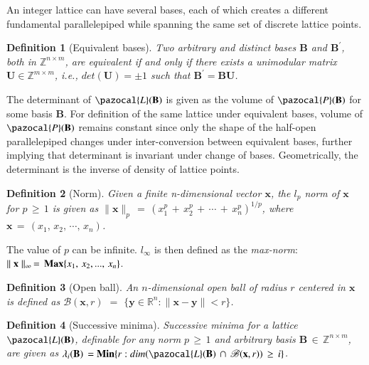 \documentclass[10pt]{elsarticle}
\newtheorem{definition}{Definition}
\begin{document}
An integer lattice can have several bases, each of which creates a different fundamental parallelepiped while spanning the same set of discrete lattice points.

\begin{definition}[Equivalent bases]
\normalfont  Two arbitrary and distinct bases $\mathbf{B}$ and
$\mathbf{B}^{\prime}$, both in $\mathbb{Z}^{n \times m}$, are
equivalent if and only if there exists a unimodular matrix
$\mathbf{U}\in\mathbb{Z}^{m \times m}$, i.e., $det(\mathbf{U})= \pm
1$ such that $\mathbf{B}^{\prime} = \mathbf{B} \mathbf{U}$.
\end{definition}

The determinant of $\pazocal{L}(\mathbf{B})$ is given as the volume
of $\pazocal{P}(\mathbf{B})$ for some basis $\mathbf{B}$. For
definition of the same lattice under equivalent bases, volume of
$\pazocal{P}(\mathbf{B})$ remains constant since only the shape of
the half-open parallelepiped changes under inter-conversion between
equivalent bases, further implying that determinant is invariant
under change of bases. Geometrically, the determinant is the inverse
of density of lattice points.

\begin{definition}[Norm]
\normalfont  Given a finite n-dimensional vector $\mathbf{x}$, the
$l_{p}$ norm of $\mathbf{x}$ for $p \, \geq \, 1$ is given as
$\parallel \mathbf{x} \parallel _{p} \, = \, (x_{1}^{p} \, + \,
x_{2}^{p} \, + \, \cdots \, + \, x_{n}^{p})^{1/p}$, where
$\mathbf{x} \, = \, (x_{1}, \, x_{2}, \, \cdots, \, x_{n})$.
\end{definition}

 The value of $p$ can be infinite. $l_{\infty}$ is then defined as the \textit{max-norm}: $\parallel \mathbf{x} \parallel _{\infty} \, = \, \mbox{\textbf{Max}}\{x_{1}, \, x_{2}, ..., \, x_{n} \}$.

\begin{definition}[Open ball]
\normalfont  An $n$-dimensional open ball of radius $r$ centered in
$\mathbf{x}$ is defined as $\mathcal{B}(\mathbf{x},r)$ $=$
$\{\mathbf{y}\in\mathbb{R}^{n}:$$\parallel$$\mathbf{x}-\mathbf{y}\parallel$$<r\}$.
\end{definition}

\begin{definition}[Successive minima]
\normalfont  Successive minima for a lattice
$\pazocal{L}(\mathbf{B})$, definable for any norm $p \, \geq \, 1$
and arbitrary basis $\mathbf{B} \, \in \, \mathbb{Z}^{n \times m}$,
are given as $\lambda_{i}(\mathbf{B}) \, = \mbox{\textbf{Min}}\{r:
dim(\pazocal{L}(\mathbf{B}) \, \cap \, \mathcal{B}(\mathbf{x},r)) \,
\geq \, i \}$.
\end{definition}
\end{document}
